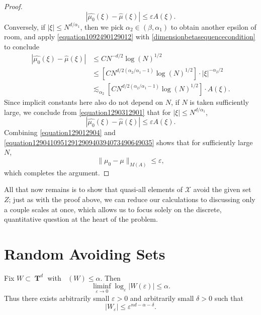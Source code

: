 \documentclass[12pt,reqno]{article}
\DeclareMathOperator{\lowminkdim}{\underline{\dim}_{\mathbf{M}}}
\DeclareMathOperator{\TT}{\mathbf{T}}
\begin{document}
\begin{proof}
    \begin{equation} \label{equation129012904}
        |\widehat{\mu_0}(\xi) - \widehat{\mu}(\xi)| \leq \varepsilon A(\xi).
    \end{equation}
    Conversely, if $|\xi| \leq N^{d/\alpha_1}$, then we pick $\alpha_2 \in (\beta,\alpha_1)$ to obtain another epsilon of room, and apply \eqref{equation1092490129012} with \eqref{dimensionbetasequencecondition} to conclude
    \begin{equation} \label{equation1290312901}
    \begin{split}
        |\widehat{\mu_0}(\xi) - \widehat{\mu}(\xi)| &\leq C N^{-d/2} \log(N)^{1/2}\\
        &\leq [C N^{d/2(\alpha_2/\alpha_1 - 1)} \log(N)^{1/2}] \cdot |\xi|^{-\alpha_2/2}\\
        &\lesssim_{\alpha_2} [C N^{d/2(\alpha_2/\alpha_1 - 1)} \log(N)^{1/2}] \cdot A(\xi).
    \end{split}
    \end{equation}
    Since implicit constants here also do not depend on $N$, if $N$ is taken sufficiently large, we conclude from \eqref{equation1290312901} that for $|\xi| \leq N^{d/\alpha_1}$,
    \begin{equation} \label{equation1290410951291290940394073490649035}
        |\widehat{\mu_0}(\xi) - \widehat{\mu}(\xi)| \leq \varepsilon A(\xi).
    \end{equation}
    Combining \eqref{equation129012904} and \eqref{equation1290410951291290940394073490649035} shows that for sufficiently large $N$,
    \[ \| \mu_0 - \mu \|_{M(A)} \leq \varepsilon, \]
    which completes the argument.
\end{proof}

All that now remains is to show that quasi-all elements of $\mathcal{X}$ avoid the given set $Z$; just as with the proof above, we can reduce our calculations to discussing only a couple scales at once, which allows us to focus solely on the discrete, quantitative question at the heart of the problem.

\section{Random Avoiding Sets}

Fix $W \subset \TT^d$ with $\lowminkdim(W) \leq \alpha$. Then
%
\[ \liminf_{\varepsilon \to 0} \log_\varepsilon |W(\varepsilon)| \leq \alpha. \]
%
Thus there exists arbitrarily small $\varepsilon > 0$ and arbitrarily small $\delta > 0$ such that
%
\[ |W_\varepsilon| \leq \varepsilon^{nd - \alpha - \delta}. \]
\end{document}
